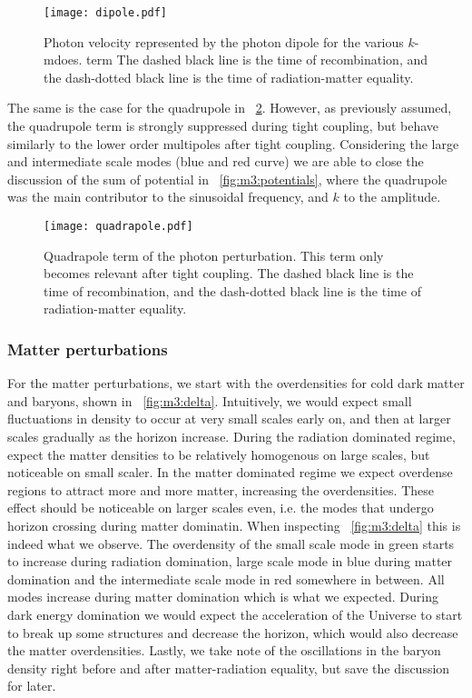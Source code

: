     \begin{figure}
        \texttt{[image: dipole.pdf]}
        \caption{Photon velocity represented by the photon dipole for the various $k$-mdoes. term The dashed black line is the time of recombination, and the dash-dotted black line is the time of radiation-matter equality.}
        \label{fig:m3:dipole}
    \end{figure}

    The same is the case for the quadrupole in ~\cref{fig:m3:quadrapole}. However, as previously assumed, the quadrupole term is strongly suppressed during tight coupling, but behave similarly to the lower order multipoles after tight coupling. Considering the large and intermediate scale modes (blue and red curve) we are able to close the discussion of the sum of potential in ~\cref{fig:m3:potentials}, where the quadrupole was the main contributor to the sinusoidal frequency, and $k$ to the amplitude. 

    \begin{figure}
        \texttt{[image: quadrapole.pdf]}
        \caption{Quadrapole term of the photon perturbation. This term only becomes relevant after tight coupling. The dashed black line is the time of recombination, and the dash-dotted black line is the time of radiation-matter equality.}
        \label{fig:m3:quadrapole}
    \end{figure}

\subsubsection{Matter perturbations}

    For the matter perturbations, we start with the overdensities for cold dark matter and baryons, shown in ~\cref{fig:m3:delta}. Intuitively, we would expect small fluctuations in density to occur at very small scales early on, and then at larger scales gradually as the horizon increase. During the radiation dominated regime, expect the matter densities to be relatively homogenous on large scales, but noticeable on small scaler. In the matter dominated regime we expect overdense regions to attract more and more matter, increasing the overdensities. These effect should be noticeable on larger scales even, i.e. the modes that undergo horizon crossing during matter dominatin. When inspecting ~\cref{fig:m3:delta} this is indeed what we observe. The overdensity of the small scale mode in green starts to increase during radiation domination, large scale mode in blue during matter domination and the intermediate scale mode in red somewhere in between. All modes increase during matter domination which is what we expected. During dark energy domination we would expect the acceleration of the Universe to start to break up some structures and decrease the horizon, which would also decrease the matter overdensities. Lastly, we take note of the oscillations in the baryon density right before and after matter-radiation equality, but save the discussion for later. 

